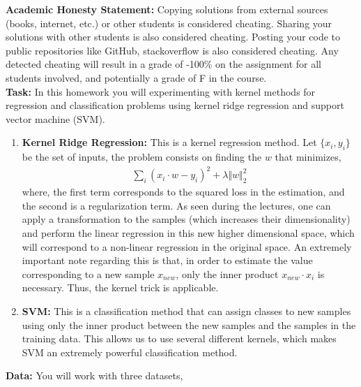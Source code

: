 \documentclass[11pt]{article}
\begin{document}
\textbf{Academic Honesty Statement:} Copying solutions from external sources (books, internet, etc.) or other students is considered cheating. Sharing your solutions with other students is also considered cheating. Posting your code to public repositories like GitHub, stackoverflow is also considered cheating. Any detected cheating will result in a grade of -100\% on the assignment for all students involved, and potentially a grade of F in the course.\\

\textbf{Task:} 
In this homework you will experimenting with kernel methods for regression and classification problems using kernel ridge regression and support vector machine (SVM).
\begin{enumerate}
\item \textbf{Kernel Ridge Regression:} This is a kernel regression method. Let $\{x_i, y_i\}$ be the set of inputs, the problem consists on finding the $w$ that minimizes,
\begin{align}
\sum_{i} (x_i \cdot w - y_i) ^ 2 + \lambda \Vert w \Vert_2^2
\end{align}
where, the first term corresponds to the squared loss in the estimation, and the second is a regularization term. As seen during the lectures, one can apply a transformation to the samples (which increases their dimensionality) and perform the linear regression in this new higher dimensional space, which will correspond to a non-linear regression in the original space. An extremely important note regarding this is that, in order to estimate the value corresponding to a new sample $x_{new}$, only the inner product $x_{new} \cdot x_i$ is necessary. Thus, the kernel trick is applicable.\\
\item \textbf{SVM:} This is a classification method that can assign classes to new samples using only the inner product between the new samples and the samples in the training data. This allows us to use several different kernels, which makes SVM an extremely powerful classification method.\\
\end{enumerate}

\textbf{Data:} You will work with three datasets,
\end{document}
